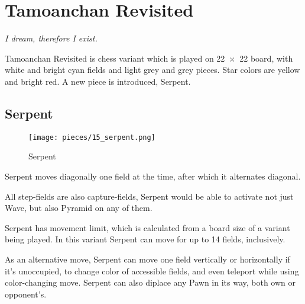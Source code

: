 

\chapter*{Tamoanchan Revisited}
\label{ch:Tamoanchan Revisited}

\begin{flushright}
\parbox{0.6\textwidth}{
\emph{I dream, therefore I exist.\newline
{} } }
\end{flushright}

\noindent
Tamoanchan Revisited is chess variant which is played on 22~$\times$~22
board, with white and bright cyan fields and light grey and grey pieces.
Star colors are yellow and bright red.
A new piece is introduced, Serpent.

\clearpage %

\section*{Serpent}
\label{sec:Tamoanchan Revisited/Serpent}

\vspace*{-0.7\baselineskip}
\noindent
\begin{wrapfigure}[11]{l}{0.4\textwidth}
\centering
\texttt{[image: pieces/15\_serpent.png]}
\caption{Serpent}
\label{fig:15_serpent}
\end{wrapfigure}
Serpent moves diagonally one field at the time, after which it alternates
diagonal.

All step-fields are also capture-fields, Serpent would be able to activate
not just Wave, but also Pyramid on any of them.

Serpent has movement limit, which is calculated from a board size of a variant
being played. In this variant Serpent can move for up to 14 fields, inclusively.

As an alternative move, Serpent can move one field vertically or horizontally
if it's unoccupied, to change color of accessible fields, and even teleport
while using color-changing move. Serpent can also diplace any Pawn in its way,
both own or opponent's.

